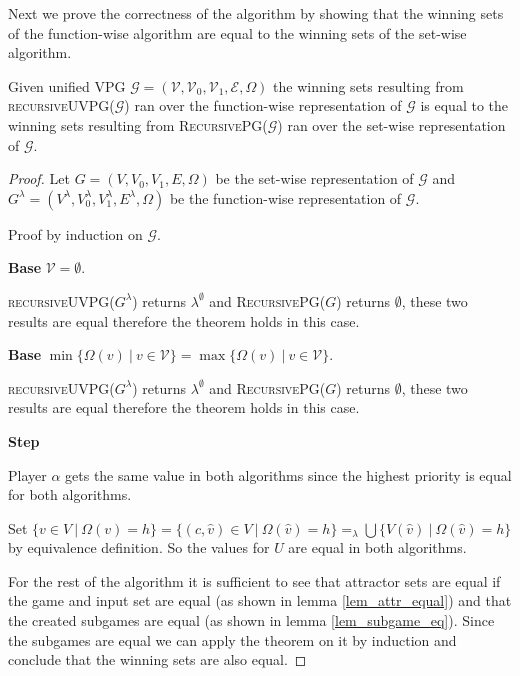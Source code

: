 Next we prove the correctness of the algorithm by showing that the winning sets of the function-wise algorithm are equal to the winning sets of the set-wise algorithm.
\begin{theorem}
	Given unified VPG $\mathcal{G} = (\mathcal{V},\mathcal{V}_0,\mathcal{V}_1, \mathcal{E}, \Omega)$ the winning sets resulting from \textsc{recursiveUVPG($\mathcal{G}$)} ran over the function-wise representation of $\mathcal{G}$ is equal to the winning sets resulting from \textsc{RecursivePG($\mathcal{G}$)} ran over the set-wise representation of $\mathcal{G}$.
	\begin{proof}
		Let $G = (V,V_0,V_1,E,\Omega)$ be the set-wise representation of $\mathcal{G}$ and $G^\lambda = (V^\lambda, V^\lambda_0, V^\lambda_1, E^\lambda, \Omega)$ be the function-wise representation of $\mathcal{G}$.
		
		Proof by induction on $\mathcal{G}$.
		
		\textbf{Base} $\mathcal{V} = \emptyset$. 
		
		\textsc{recursiveUVPG($G^\lambda$)} returns $\lambda^\emptyset$ and \textsc{RecursivePG($G$)} returns $\emptyset$, these two results are equal therefore the theorem holds in this case.
		
		\textbf{Base} $\min\{\Omega(v)\ |\ v \in \mathcal{V}\} = \max\{\Omega(v)\ |\ v \in \mathcal{V}\}$.
		
		\textsc{recursiveUVPG($G^\lambda$)} returns $\lambda^\emptyset$ and \textsc{RecursivePG($G$)} returns $\emptyset$, these two results are equal therefore the theorem holds in this case.
		
		\textbf{Step}
		
		Player $\alpha$ gets the same value in both algorithms since the highest priority is equal for both algorithms.
		
		Set $\{v \in V\ |\ \Omega(v) = h\} = \{(c,\hat{v}) \in V\ |\ \Omega(\hat{v}) = h \} =_\lambda  \bigcup\{V(\hat{v})\ |\ \Omega(\hat{v}) = h \}$ by equivalence definition. So the values for $U$ are equal in both algorithms.
		
		For the rest of the algorithm it is sufficient to see that attractor sets are equal if the game and input set are equal (as shown in lemma \ref{lem_attr_equal}) and that the created subgames are equal (as shown in lemma \ref{lem_subgame_eq}). Since the subgames are equal we can apply the theorem on it by induction and conclude that the winning sets are also equal.
	\end{proof}
\end{theorem}

